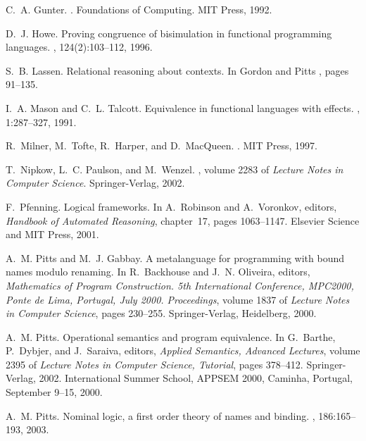 \documentclass{LMCS}
\theoremstyle{plain}
\theoremstyle{definition}
\begin{document}
\begin{thebibliography}{MTHM97}
C.~A. Gunter.
.
\newblock Found\-ations of Computing. MIT Press, 1992.

D.~J. Howe.
\newblock Proving congruence of bisimulation in functional programming
  languages.
, 124(2):103--112, 1996.

S.~B. Lassen.
\newblock Relational reasoning about contexts.
\newblock In Gordon and Pitts \cite{GordonAD:higoot}, pages 91--135.

I.~A. Mason and C.~L. Talcott.
\newblock Equivalence in functional languages with effects.
, 1:287--327, 1991.

R.~Milner, M.~Tofte, R.~Harper, and D.~MacQueen.
.
\newblock MIT Press, 1997.

T.~Nipkow, L.~C. Paulson, and M.~Wenzel.
,
  volume 2283 of {\em Lecture Notes in Computer Science}.
\newblock Springer-Verlag, 2002.

F.~Pfenning.
\newblock Logical frameworks.
\newblock In A.~Robinson and A.~Voronkov, editors, {\em Handbook of Automated
  Reasoning}, chapter~17, pages 1063--1147. Elsevier Science and MIT Press,
  2001.

A.~M. Pitts and M.~J. Gabbay.
\newblock A metalanguage for programming with bound names modulo renaming.
\newblock In R.~Backhouse and J.~N. Oliveira, editors, {\em Mathematics of
  Program Construction. 5th International Conference, MPC2000, Ponte de Lima,
  Portugal, July 2000. Proceedings}, volume 1837 of {\em Lecture Notes in
  Computer Science}, pages 230--255. Springer-Verlag, Heidelberg, 2000.

A.~M. Pitts.
\newblock Operational semantics and program equivalence.
\newblock In G.~Barthe, P.~Dybjer, and J.~Saraiva, editors, {\em Applied
  Semantics, Advanced Lectures}, volume 2395 of {\em Lecture Notes in Computer
  Science, Tutorial}, pages 378--412. Springer-Verlag, 2002.
\newblock International Summer School, {APPSEM} 2000, Caminha, Portugal,
  September 9--15, 2000.

A.~M. Pitts.
\newblock Nominal logic, a first order theory of names and binding.
, 186:165--193, 2003.


\end{thebibliography}
\end{document}
